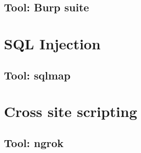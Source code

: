 \documentclass[12pt]{beamer}
\begin{document}
\subsection{Tool: Burp suite}

\begin{frame}{}
\end{frame}

\section{SQL Injection}
\begin{frame}{}
\end{frame}

\subsection{Tool: sqlmap}
\begin{frame}{}
\end{frame}


\section{Cross site scripting}
\begin{frame}{}
\end{frame}

\subsection{Tool: ngrok}
\begin{frame}{}
\end{frame}
\end{document}
